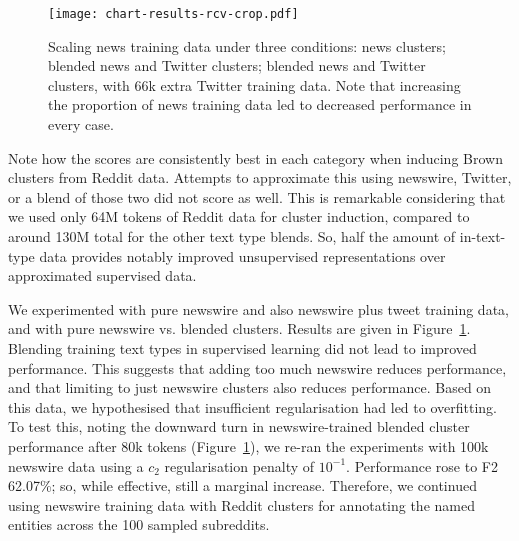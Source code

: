 \documentclass[sigconf]{acmart}
\begin{document}
\begin{figure}
\centering
\texttt{[image: chart-results-rcv-crop.pdf]}
\caption{Scaling news training data under three conditions: news clusters; blended news and Twitter clusters; blended news and Twitter clusters, with 66k extra Twitter training data. Note that increasing the proportion of news training data led to decreased performance in every case.}
\label{fig:rcv-scaling}
\end{figure}

Note how the scores are consistently best in each category when inducing Brown clusters from Reddit data.
Attempts to approximate this using newswire, Twitter, or a blend of those two did not score as well.
This is remarkable considering that we used only 64M tokens of Reddit data for cluster induction, compared to around 130M total for the other text type blends.
So, half the amount of in-text-type data provides notably improved unsupervised representations over approximated supervised data.

We experimented with pure newswire and also newswire plus tweet training data, and with pure newswire vs. blended clusters.
Results are given in Figure~\ref{fig:rcv-scaling}.
Blending training text types in supervised learning did not lead to improved performance.
This suggests that adding too much newswire reduces performance, and that limiting to just newswire clusters also reduces performance.
Based on this data, we hypothesised that insufficient regularisation had led to overfitting.
To test this, noting the downward turn in newswire-trained blended cluster performance after 80k tokens (Figure~\ref{fig:rcv-scaling}), we re-ran the experiments with 100k newswire data using a $c_2$ regularisation penalty of $10^{-1}$. %
Performance rose to F2 62.07\%; so, while effective, still a marginal increase.
Therefore, we continued using newswire training data with Reddit clusters for annotating the named entities across the 100 sampled subreddits.%
\end{document}
